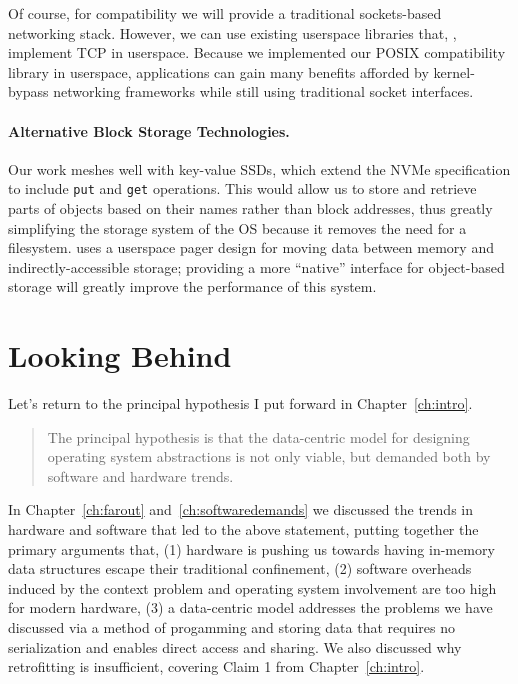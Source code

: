     Of course, for compatibility we will provide a traditional sockets-based networking stack. However,
    we can use existing userspace libraries that, \eg, implement TCP in userspace.
    Because we implemented our POSIX compatibility library in userspace, applications can gain many
    benefits afforded by kernel-bypass networking frameworks while still using traditional socket
    interfaces.

\fi

\paragraph{Alternative Block Storage Technologies.}

Our work meshes well with key-value SSDs, which extend the NVMe
specification to include \texttt{put} and \texttt{get} operations. This would allow us to store and
retrieve parts of objects based on their names rather than block addresses, thus greatly
simplifying the storage system of the OS because it removes the need for a filesystem. \Twizzler
uses a userspace pager design for moving data between memory and indirectly-accessible storage;
providing a more ``native'' interface for object-based storage will greatly improve the performance
of this system.



\section{Looking Behind}


Let's return to the principal hypothesis I put forward in Chapter~\ref{ch:intro}.

\begin{quotation}
    \noindent The principal hypothesis is that the data-centric model
    for designing operating system abstractions is not only viable, but demanded both by software and hardware trends.
\end{quotation}

In Chapter~\ref{ch:farout} and~\ref{ch:softwaredemands} we discussed the trends in hardware and software that led to
the above statement, putting together the primary arguments that, (1) hardware is pushing us towards having in-memory
data structures escape their traditional confinement, (2) software overheads induced by the context problem and
operating system involvement are too high for modern hardware, (3) a data-centric model addresses the problems we have
discussed via a method of progamming and storing data that requires no serialization and enables direct access and
sharing. We also discussed why retrofitting is insufficient, covering Claim 1 from Chapter~\ref{ch:intro}.

